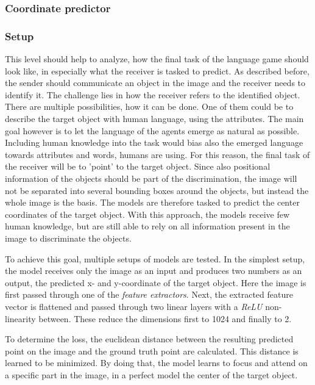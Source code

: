 \subsubsection{Coordinate predictor}
\subsubsection*{Setup}

This level should help to analyze, how the final task of the language game should look like, in especially what the receiver is tasked to predict.
As described before, the sender should communicate an object in the image and the receiver needs to identify it.
The challenge lies in how the receiver refers to the identified object.
There are multiple possibilities, how it can be done.
One of them could be to describe the target object with human language, using the attributes.
The main goal however is to let the language of the agents emerge as natural as possible.
Including human knowledge into the task would bias also the emerged language towards attributes and words, humans are using.
For this reason, the final task of the receiver will be to 'point' to the target object.
Since also positional information of the objects should be part of the discrimination, the image will not be separated into several bounding boxes around the objects, but instead the whole image is the basis.
The models are therefore tasked to predict the center coordinates of the target object.
With this approach, the models receive few human knowledge, but are still able to rely on all information present in the image to discriminate the objects.

To achieve this goal, multiple setups of models are tested.
In the simplest setup, the model receives only the image  as an input and produces two numbers as an output, the predicted x- and y-coordinate of the target object.
Here the image is first passed through one of the \emph{feature extractors}.
Next, the extracted feature vector is flattened and passed through two linear layers with a \emph{ReLU} non-linearity between.
These reduce the dimensions first to 1024 and finally to 2.

To determine the loss, the euclidean distance between the resulting predicted point on the image and the ground truth point are calculated.
This distance is learned to be minimized.
By doing that, the model learns to focus and attend on a specific part in the image, in a perfect model the center of the target object.

